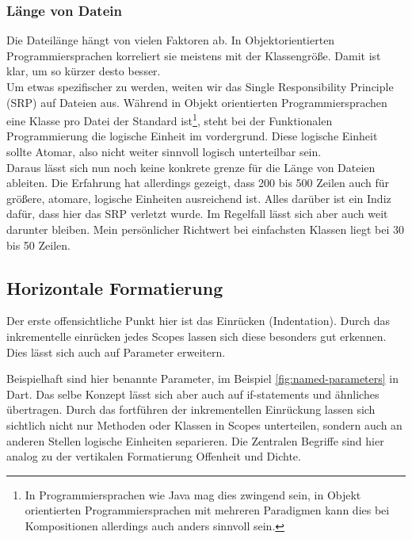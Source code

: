         \subsubsection{Länge von Datein}
            Die Dateilänge hängt von vielen Faktoren ab.
            In Objektorientierten Programmiersprachen korreliert sie meistens mit der Klassengröße.
            Damit ist klar, um so kürzer desto besser.\\
            Um etwas spezifischer zu werden, weiten wir das Single Responsibility Principle (SRP) auf Dateien aus.
            Während in Objekt orientierten Programmiersprachen eine Klasse pro Datei der Standard ist\footnote{In Programmiersprachen wie Java mag dies zwingend sein, in Objekt orientierten Programmiersprachen mit mehreren Paradigmen kann dies bei Kompositionen allerdings auch anders sinnvoll sein.}, steht bei der Funktionalen Programmierung die logische Einheit im vordergrund.
            Diese logische Einheit sollte Atomar, also nicht weiter sinnvoll logisch unterteilbar sein.\\
            Daraus lässt sich nun noch keine konkrete grenze für die Länge von Dateien ableiten.
            Die Erfahrung hat allerdings gezeigt, dass 200 bis 500 Zeilen auch für größere, atomare, logische Einheiten ausreichend ist.
            Alles darüber ist ein Indiz dafür, dass hier das SRP verletzt wurde.
            Im Regelfall lässt sich aber auch weit darunter bleiben.
            Mein persönlicher Richtwert bei einfachsten Klassen liegt bei 30 bis 50 Zeilen.

    \subsection{Horizontale Formatierung}
        Der erste offensichtliche Punkt hier ist das Einrücken (Indentation).
        Durch das inkrementelle einrücken jedes Scopes lassen sich diese besonders gut erkennen.
        Dies lässt sich auch auf Parameter erweitern.
        
        Beispielhaft sind hier benannte Parameter, im Beispiel \ref{fig:named-parameters} in Dart.
        Das selbe Konzept lässt sich aber auch auf if-statements und ähnliches übertragen.
        Durch das fortführen der inkrementellen Einrückung lassen sich sichtlich nicht nur Methoden oder Klassen in Scopes unterteilen, sondern auch an anderen Stellen logische Einheiten separieren.
        Die Zentralen Begriffe sind hier analog zu der vertikalen Formatierung Offenheit und Dichte.
